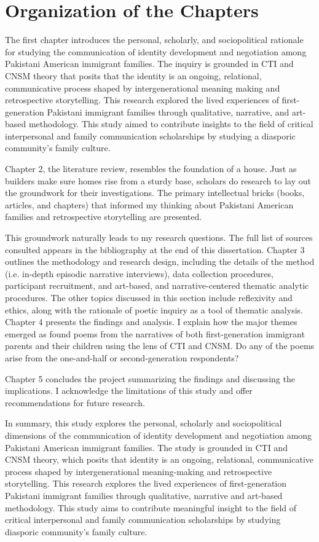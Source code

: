 \section{Organization of the Chapters}

The first chapter introduces the personal, scholarly, and sociopolitical rationale for studying the communication of identity development and negotiation among Pakistani American immigrant families. The inquiry is grounded in CTI and CNSM theory that posits that the identity is an ongoing, relational, communicative process shaped by intergenerational meaning making and retrospective storytelling. This research explored the lived experiences of first-generation Pakistani immigrant families through qualitative, narrative, and art-based methodology. This study aimed to contribute insights to the field of critical interpersonal and family communication scholarships by studying a diasporic community’s family culture. 

Chapter 2, the literature review, resembles the foundation of a house. Just as builders make sure homes rise from a sturdy base, scholars do research to lay out the groundwork for their investigations. The primary intellectual bricks (books, articles, and chapters) that informed my thinking about Pakistani American families and retrospective storytelling are presented.

This groundwork naturally leads to my research questions. The full list of sources consulted appears in the bibliography at the end of this dissertation.
Chapter 3 outlines the methodology and research design, including the details of the method (i.e. in-depth episodic narrative interviews), data collection procedures, participant recruitment, and art-based, and narrative-centered thematic analytic procedures. The other topics discussed in this section include reflexivity and ethics, along with the rationale of poetic inquiry as a tool of thematic analysis. 
Chapter 4 presents the findings and analysis. I explain how the major themes emerged as found poems from the narratives of both first-generation immigrant parents and their children using the lens of CTI and CNSM. Do any of the poems arise from the one-and-half or second-generation respondents?

Chapter 5 concludes the project summarizing the findings and discussing the implications. I acknowledge the limitations of this study and offer recommendations for future research.

In summary, this study explores the personal, scholarly and sociopolitical dimensions of the communication of identity development and negotiation among Pakistani American immigrant families. The study is grounded in CTI and CNSM theory, which posits that identity is an ongoing, relational, communicative process shaped by intergenerational meaning-making and retrospective storytelling. This research explores the lived experiences of first-generation Pakistani immigrant families through qualitative, narrative and art-based methodology. This study aims to contribute meaningful insight to the field of critical interpersonal and family communication scholarships by studying diasporic community’s family culture.
